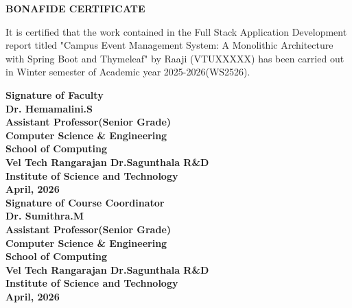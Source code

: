 \documentclass[12pt]{report}
\begin{document}
\newpage 
{} 
\begin{center} 
{\Huge \textbf{ BONAFIDE CERTIFICATE}}\\[0.5cm] 
\end{center} 
\linespread{1.5} 
\large{It is certified that the work contained in the Full Stack Application Development \\report titled "Campus Event Management System: A Monolithic Architecture with Spring Boot and Thymeleaf" by Raaji (VTUXXXXX) has been carried out in Winter semester of Academic year 2025-2026(WS2526).} 
\vspace{1.5cm} 
\begin{flushright} 
\textbf{Signature of Faculty\\Dr. Hemamalini.S\\Assistant Professor(Senior Grade)\\Computer Science \& 
Engineering\\School of Computing\\Vel Tech Rangarajan Dr.Sagunthala R\&D\\Institute of Science and Technology\\April, 2026}\\[2.0cm] 
\textbf{Signature of Course Coordinator\\Dr. Sumithra.M\\Assistant Professor(Senior Grade)\\Computer Science \& Engineering\\School of Computing\\Vel Tech Rangarajan Dr.Sagunthala R\&D\\Institute of Science and Technology\\April, 2026}\\  
\end{flushright} 
 
\end{document}
